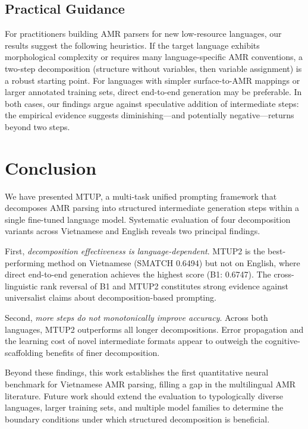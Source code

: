 \documentclass[11pt,a4paper]{article}
\begin{document}
\subsection{Practical Guidance}

For practitioners building AMR parsers for new low-resource languages, our
results suggest the following heuristics. If the target language exhibits
morphological complexity or requires many language-specific AMR conventions, a
two-step decomposition (structure without variables, then variable assignment)
is a robust starting point. For languages with simpler surface-to-AMR mappings
or larger annotated training sets, direct end-to-end generation may be
preferable. In both cases, our findings argue against speculative addition of
intermediate steps: the empirical evidence suggests diminishing---and
potentially negative---returns beyond two steps.

\section{Conclusion}
\label{sec:conclusion}

We have presented MTUP, a multi-task unified prompting framework that
decomposes AMR parsing into structured intermediate generation steps within a
single fine-tuned language model. Systematic evaluation of four decomposition
variants across Vietnamese and English reveals two principal findings.

First, \emph{decomposition effectiveness is language-dependent}. MTUP2 is
the best-performing method on Vietnamese (SMATCH 0.6494) but not on English,
where direct end-to-end generation achieves the highest score (B1: 0.6747). The
cross-linguistic rank reversal of B1 and MTUP2 constitutes strong evidence
against universalist claims about decomposition-based prompting.

Second, \emph{more steps do not monotonically improve accuracy}. Across both
languages, MTUP2 outperforms all longer decompositions. Error propagation and
the learning cost of novel intermediate formats appear to outweigh the
cognitive-scaffolding benefits of finer decomposition.

Beyond these findings, this work establishes the first quantitative neural
benchmark for Vietnamese AMR parsing, filling a gap in the multilingual AMR
literature. Future work should extend the evaluation to typologically diverse
languages, larger training sets, and multiple model families to determine the
boundary conditions under which structured decomposition is beneficial.
\end{document}
